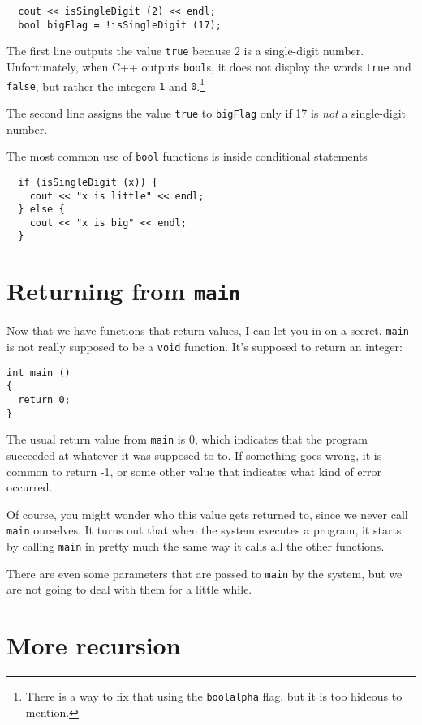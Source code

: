 \begin{verbatim}
  cout << isSingleDigit (2) << endl;
  bool bigFlag = !isSingleDigit (17);
\end{verbatim}
%
The first line outputs the value {\tt true} because 2 is a
single-digit number.  Unfortunately, when C++ outputs {\tt bool}s, it
does not display the words {\tt true} and {\tt false}, but rather the
integers {\tt 1} and {\tt 0}.\footnote{There is a way to fix that
using the {\tt boolalpha} flag, but it is too hideous to mention.}

The second line assigns the value {\tt true} to {\tt bigFlag}
only if 17 is {\em not} a single-digit number.

The most common use of {\tt bool} functions is inside conditional
statements

\begin{verbatim}
  if (isSingleDigit (x)) {
    cout << "x is little" << endl;
  } else {
    cout << "x is big" << endl;
  }
\end{verbatim}

\section {Returning from {\tt main}}

Now that we have functions that return values, I can let you in
on a secret.  {\tt main} is not really supposed to be a {\tt void}
function.  It's supposed to return an integer:

\begin{verbatim}
int main ()
{
  return 0;
}  
\end{verbatim}
%
The usual return value from {\tt main} is 0, which indicates that
the program succeeded at whatever it was supposed to to.  If something
goes wrong, it is common to return -1, or some other value that
indicates what kind of error occurred.

Of course, you might wonder who this value gets returned to, since
we never call {\tt main} ourselves.  It turns out that when the
system executes a program, it starts by calling {\tt main}
in pretty much the same way it calls all the other functions.

There are even some parameters that are passed to {\tt main}
by the system, but we are not going to deal with them for a little
while.

\section {More recursion}

